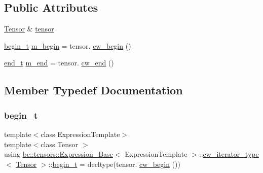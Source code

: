 \subsection*{Public Attributes}
\begin{DoxyCompactItemize}
\item 
\hyperlink{namespacebc_a659391e47ab612be3ba6c18cf9c89159}{Tensor} \& \hyperlink{structbc_1_1tensors_1_1Expression__Base_1_1cw__iterator__type_a111bae1235814e66049506ccc1371809}{tensor}
\item 
\hyperlink{structbc_1_1tensors_1_1Expression__Base_1_1cw__iterator__type_a61e8ad264dbd2dc886a84e03cd45867e}{begin\+\_\+t} \hyperlink{structbc_1_1tensors_1_1Expression__Base_1_1cw__iterator__type_a5043d6948601397e5e0516bf18ffac31}{m\+\_\+begin} = tensor. \hyperlink{classbc_1_1tensors_1_1Expression__Base_ab7254a15d10156123aec300006eb1c9d}{cw\+\_\+begin} ()
\item 
\hyperlink{structbc_1_1tensors_1_1Expression__Base_1_1cw__iterator__type_aa4dec4d7233266282d8243b49a101174}{end\+\_\+t} \hyperlink{structbc_1_1tensors_1_1Expression__Base_1_1cw__iterator__type_a646e686646c888998069d4b67468f2ef}{m\+\_\+end} = tensor. \hyperlink{classbc_1_1tensors_1_1Expression__Base_a4ca9ee5e831fdfa6575e34071927cc1e}{cw\+\_\+end} ()
\end{DoxyCompactItemize}


\subsection{Member Typedef Documentation}
\mbox{\label{structbc_1_1tensors_1_1Expression__Base_1_1cw__iterator__type_a61e8ad264dbd2dc886a84e03cd45867e}} 
\subsubsection{\texorpdfstring{begin\+\_\+t}{begin\_t}}
{\footnotesize\ttfamily template$<$class Expression\+Template$>$ \\
template$<$class Tensor $>$ \\
using \hyperlink{classbc_1_1tensors_1_1Expression__Base}{bc\+::tensors\+::\+Expression\+\_\+\+Base}$<$ Expression\+Template $>$\+::\hyperlink{structbc_1_1tensors_1_1Expression__Base_1_1cw__iterator__type}{cw\+\_\+iterator\+\_\+type}$<$ \hyperlink{namespacebc_a659391e47ab612be3ba6c18cf9c89159}{Tensor} $>$\+::\hyperlink{structbc_1_1tensors_1_1Expression__Base_1_1cw__iterator__type_a61e8ad264dbd2dc886a84e03cd45867e}{begin\+\_\+t} =  decltype(tensor. \hyperlink{classbc_1_1tensors_1_1Expression__Base_ab7254a15d10156123aec300006eb1c9d}{cw\+\_\+begin} ())}

